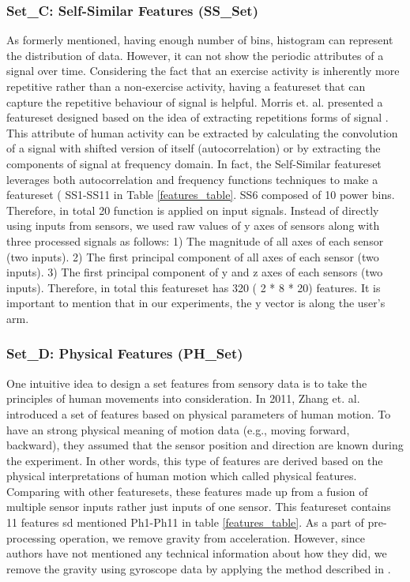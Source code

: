 \documentclass[journal,article,submit,moreauthors,pdftex]{Definitions/mdpi}
\begin{document}
\subsubsection{Set\_C: Self-Similar Features (SS\_Set)}
As formerly mentioned, having enough number of bins, histogram can represent the distribution of data. However, it can not show the periodic attributes of a signal over time. Considering the fact that an exercise activity is inherently more repetitive rather than a non-exercise activity, having a featureset that can capture the repetitive behaviour of signal is helpful. Morris et. al. presented a featureset designed based on the idea of extracting repetitions forms of signal \cite{morris2014recofit}. This attribute of human activity can be extracted by calculating the convolution of a signal with shifted version of itself (autocorrelation) or by extracting the components of signal at frequency domain. In fact, the Self-Similar featureset leverages both autocorrelation and frequency functions techniques to make a featureset ( SS1-SS11 in Table \ref{features_table}. SS6 composed of 10 power bins. Therefore, in total 20 function is applied on input signals. Instead of directly using inputs from sensors, we used raw values of y axes of sensors along with three processed signals as follows:
1) The magnitude of all axes of each sensor (two inputs). 2) The first principal component of all axes of each sensor (two inputs). 3) The first principal component of y and z axes of each sensors (two inputs). Therefore, in total this featureset has 320 ( 2 * 8 * 20) features.
It is important to mention that in our experiments, the y vector is along the user's arm. 
\subsubsection{Set\_D: Physical Features (PH\_Set)}
One intuitive idea to design a set features from sensory data is to take the principles of human movements into consideration. In 2011, Zhang et. al. \cite{zhang2011feature} introduced a set of features based on physical parameters of human motion. To have an strong physical meaning of motion data (e.g., moving forward, backward), they assumed that the sensor position and direction are known during the experiment. In other words, this type of features are derived based on the physical interpretations of human motion which called physical features. Comparing with other featuresets, these features made up from a fusion of multiple sensor inputs rather just inputs of one sensor. This featureset contains 11 features sd mentioned Ph1-Ph11 in table \ref{features_table}.
As a part of pre-processing operation, we remove gravity from acceleration. However, since authors have not mentioned any technical information about how they did, we remove the gravity using gyroscope data by applying the method described in \cite{Accelero5:online}.
\end{document}
